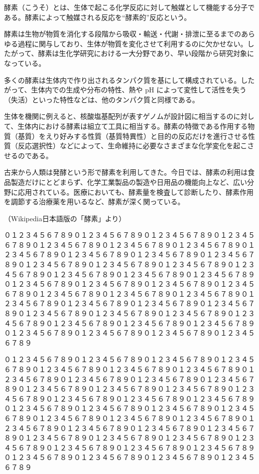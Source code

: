 \documentclass{ltjtarticle}
\begin{document}
酵素（こうそ）とは、生体で起こる化学反応に対して触媒として機能する分子である。酵素によって触媒される反応を“酵素的”反応という。

酵素は生物が物質を消化する段階から吸収・輸送・代謝・排泄に至るまでのあらゆる過程に関与しており、生体が物質を変化させて利用するのに欠かせない。したがって、酵素は生化学研究における一大分野であり、早い段階から研究対象になっている。

多くの酵素は生体内で作り出されるタンパク質を基にして構成されている。したがって、生体内での生成や分布の特性、熱や pH によって変性して活性を失う（失活）といった特性などは、他のタンパク質と同様である。

生体を機関に例えると、核酸塩基配列が表すゲノムが設計図に相当するのに対して、生体内における酵素は組立て工具に相当する。酵素の特徴である作用する物質（基質）をえり好みする性質（基質特異性）と目的の反応だけを進行させる性質（反応選択性）などによって、生命維持に必要なさまざまな化学変化を起こさせるのである。

古来から人類は発酵という形で酵素を利用してきた。今日では、酵素の利用は食品製造だけにとどまらず、化学工業製品の製造や日用品の機能向上など、広い分野に応用されている。医療においても、酵素量を検査して診断したり、酵素作用を調節する治療薬を用いるなど、酵素が深く関っている。

\leavevmode\hfill  （Wikipedia日本語版の「酵素」より）

\def\R{０１２３４５６７８９０１２３４５６７８９}
\def\S{\R\R\R\R\R\R\R\R\R\R\R\R\R\R\R\R\R\R\R\R\par}

\S\S
\end{document}
